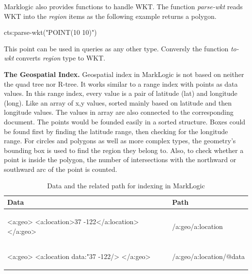\documentclass[a4paper,12pt]{article}
\begin{document}
Marklogic also provides functions to handle WKT. The function \textit{parse-wkt} reads WKT into the \textit{region} items as the following example returns a polygon.
\vspace{10px}
\begin{fakeJSON}
cts:parse-wkt("POINT(10 10)")
\end{fakeJSON}
\vspace{10px}
This point can be used in queries as any other type. Conversly the function \textit{to-wkt} converts \textit{region} type to WKT.


\textbf{The Geospatial Index.}
Geospatial index in MarkLogic is not based on neither the quad tree nor R-tree. It works similar to a range index with points as data values. In this range index, every value is a pair of latitude (lat) and longitude (long). Like an array of x,y values, sorted mainly based on latitude and then longitude values. The values in array are also connected to the corresponding document.
The points would be founded easily in a sorted structure. 
Boxes could be found first by finding the latitude range, then checking for the longitude range. 
For circles and polygons as well as more complex types, the geometry's bounding box is used to find the region they belong to. 
Also, to check whether a point is inside the polygon, the number of intersections with the northward or southward arc of the point is counted.
\vspace{10px}
\begin{table}
\centering
\begin{tabular}{|l |l |}\hline
\textbf{Data} & \textbf{Path}\\\hline
\begin{fakeJSON}
<a:geo>
  <a:location>37 -122</a:location>
</a:geo>
\end{fakeJSON} &
\begin{fakeJSON}
/a:geo/a:location
\end{fakeJSON}\\\hline
\begin{fakeJSON}
<a:geo>
  <a:location data:"37 -122/>
</a:geo>
\end{fakeJSON} &
\begin{fakeJSON}
/a:geo/a:location/@data
\end{fakeJSON}
\\\hline
\end{tabular}
\caption{Data and the related path for indexing in MarkLogic}
\label{t.pathindexmarklogic}
\end{table}
\vspace{10px}
\end{document}
